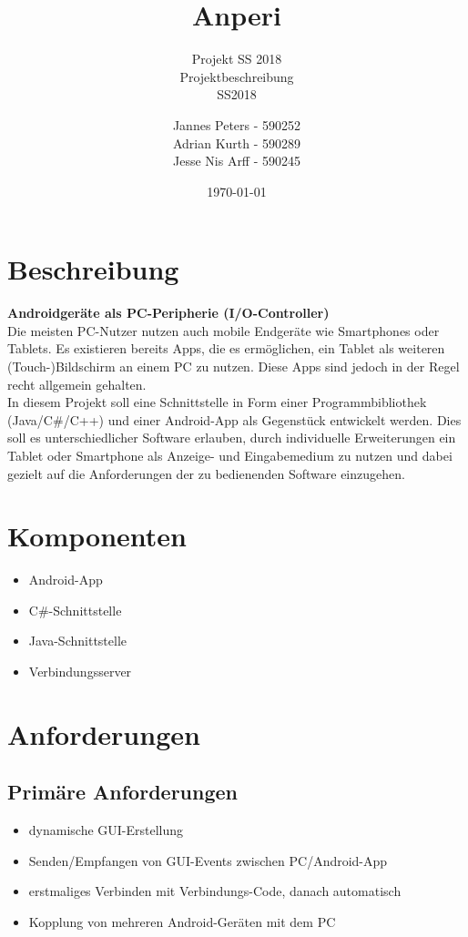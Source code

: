 \documentclass{scrartcl}
\title{Anperi}
\subtitle{Projekt SS 2018\\ Projektbeschreibung \\  SS2018}
\author{Jannes Peters - 590252 \\ Adrian Kurth - 590289 \\ Jesse Nis Arff - 590245}
\date{\today}
\begin{document}
\maketitle
\newpage
\renewcommand\contentsname{Inhalt}
\tableofcontents{}
\newpage

\pagestyle{scrheadings}
\addtolength{\voffset}{-15pt}
\setheadsepline{0.4pt}

\section{Beschreibung}
\textbf{Androidgeräte als PC-Peripherie (I/O-Controller)}\\
Die meisten PC-Nutzer nutzen auch mobile Endgeräte wie Smart­phones oder Tablets. Es existieren bereits Apps, die es ermöglichen, ein Tablet als weiteren (Touch-)Bildschirm an einem PC zu nutzen. Diese Apps sind jedoch in der Regel recht allgemein gehalten.\\
In diesem Projekt soll eine Schnittstelle in Form einer Programm­bibliothek (Java/C\#/C++) und einer Android-App als Gegenstück entwickelt werden. Dies soll es unterschiedlicher Software erlauben, durch individuelle Erweiterungen ein Tablet oder Smartphone als Anzeige- und Eingabe­medium zu nutzen und dabei gezielt auf die Anforderungen der zu bedienenden Software einzugehen.
\section{Komponenten}
\begin{itemize}
	\item Android-App
	\item C\#-Schnittstelle
	\item Java-Schnittstelle
	\item Verbindungsserver
\end{itemize}
\section{Anforderungen}
\subsection{Primäre Anforderungen}
\begin{itemize}
	\item dynamische GUI-Erstellung
	\item Senden/Empfangen von GUI-Events zwischen PC/Android-App
	\item erstmaliges Verbinden mit Verbindungs-Code, danach automatisch
	\item Kopplung von mehreren Android-Geräten mit dem PC
\end{itemize}
\end{document}
